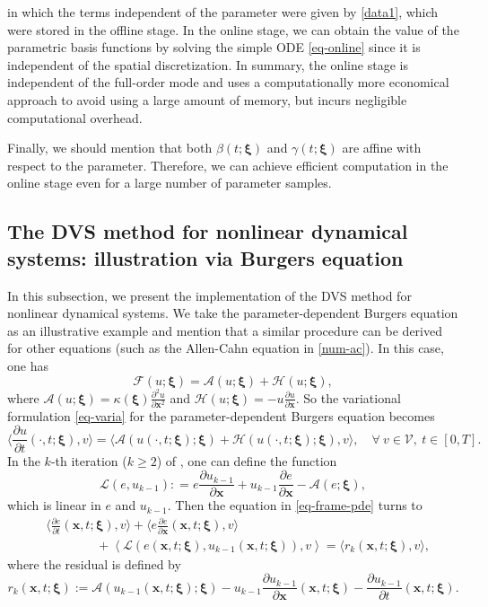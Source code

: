 \documentclass[10pt,a4paper]{article}
\numberwithin{equation}{section}
\numberwithin{lemma}{section}
\numberwithin{example}{section}
\numberwithin{definition}{section}
\numberwithin{assumption}{section}
\numberwithin{theorem}{section}
\numberwithin{proposition}{section}
\numberwithin{corollary}{section}
\numberwithin{remark}{section}
\begin{document}
in which the terms independent of the parameter were given by \eqref{data1}, which were stored in the offline stage. 
In the online stage, we can obtain the value of the parametric basis functions by solving the simple ODE \eqref{eq-online} since it is independent of the spatial discretization. 
In summary, 
the online stage is independent of the full-order mode and uses a computationally more economical approach to avoid using a large amount of memory, but incurs negligible computational overhead.

Finally, we should mention that both $\beta(t;\bm{\xi})$ and $\gamma(t;\bm{\xi})$ are affine with respect to the parameter. Therefore, we can achieve efficient computation in the online stage even for a large number of parameter samples.
 





\subsection{The DVS method for nonlinear dynamical systems: illustration via Burgers equation}
\label{sec-dvs-burgers}
In this subsection, we present the implementation of the DVS method for nonlinear dynamical systems. We take the parameter-dependent Burgers equation as an illustrative example and mention that a similar procedure can be derived for other equations (such as the Allen-Cahn equation in \cref{num-ac}).
In this case, one has
$$
\mathcal{F}(u;\bm{\xi})=\mathcal{A}(u;\bm{\xi})+\mathcal{H}(u;\bm{\xi}),
$$
where $\mathcal{A}(u;\bm{\xi})=\kappa(\bm{\xi})\frac{\partial^2 u}{\partial \bm{x}^2}$ and $\mathcal{H}(u;\bm{\xi})=-u\frac{\partial u}{\partial \bm{x}}$. 
So the variational formulation \eqref{eq-varia} for the parameter-dependent Burgers equation becomes
$$
\Big\langle \frac{\partial u}{\partial t}(\cdot,t;\bm{\xi}),v\Big\rangle =\langle \mathcal{A}(u(\cdot,t;\bm{\xi});\bm{\xi}) + \mathcal{H}(u(\cdot,t;\bm{\xi});\bm{\xi}) ,v\rangle,
\quad \forall~ v\in \mathcal{V},~ t\in [0,T].
$$
In the $k$-th iteration ($k\ge 2$) of  , one can define the function 
$$
\mathcal{L}(e,u_{k-1}): =e\frac{\partial u_{k-1}}{\partial \bm{x}}+ u_{k-1}\frac{\partial e}{\partial \bm{x}}- \mathcal{A}(e;\bm{\xi}),
$$
which is linear in $e$ and $u_{k-1}$. Then the equation in \eqref{eq-frame-pde} turns to
\begin{equation}
\label{eq-burgers-pde}
\begin{aligned}
&\Big\langle \frac{\partial e}{\partial t}(\bm{x},t;\bm{\xi}),v\Big\rangle
+\Big\langle e\frac{\partial e}{\partial \bm{x}}(\bm{x},t;\bm{\xi}),v\Big\rangle\\
&\qquad\qquad +\left\langle \mathcal{L}(e(\bm{x},t;\bm{\xi}),u_{k-1}(\bm{x},t;\bm{\xi})),v\right\rangle
=\langle r_k(\bm{x},t;\bm{\xi}),v\rangle,
\end{aligned}
\end{equation}
where the residual is defined by
$$
r_k(\bm{x},t;\bm{\xi}):=\mathcal{A} (u_{k-1}(\bm{x},t;\bm{\xi});\bm{\xi}) - u_{k-1}\frac{\partial u_{k-1}}{\partial \bm{x}}(\bm{x},t;\bm{\xi})-\frac{\partial u_{k-1}}{\partial t}(\bm{x},t;\bm{\xi}).
$$
\end{document}
